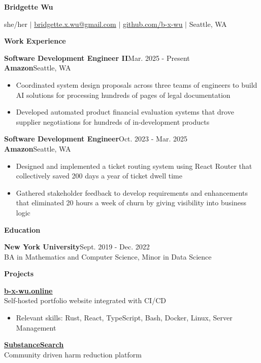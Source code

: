 \documentclass[11pt, oneside]{article}
\def\lralign #1#2{#1\hfill#2}
\def\experience #1#2#3{\vspace{6pt}\lralign{\textbf{\large#1}}{{#2}}\\#3}
\def\sectionheader #1{\vspace{15pt}\textbf{\Large #1}}
\def\link #1#2{\href{#1}{\ul{#2}}}
\begin{document}
\textbf{\LARGE Bridgette Wu}

she/her $\mid$ \link{mailto:bridgette.x.wu@gmail.com}{bridgette.x.wu@gmail.com} $\mid$ \link{https://github.com/b-x-wu}{github.com/b-x-wu} $\mid$ Seattle, WA

\sectionheader{Work Experience}

\experience{Software Development Engineer II}{Mar. 2025 - Present}{\lralign{\textbf{Amazon}}{Seattle, WA}}
\begin{itemize}
\item Coordinated system design proposals across three teams of engineers to build AI solutions for
processing hundreds of pages of legal documentation

\item Developed automated product financial evaluation systems that drove supplier negotiations for
hundreds of in-development products
\end{itemize}

\experience{Software Development Engineer}{Oct. 2023 - Mar. 2025}{\lralign{\textbf{Amazon}}{Seattle, WA}}

\begin{itemize}
\item Designed and implemented a ticket routing system using React Router that collectively saved
200 days a year of ticket dwell time

\item Gathered stakeholder feedback to develop requirements and enhancements that eliminated 20 hours a week of churn by giving visibility into business logic
\end{itemize}

\sectionheader{Education}

\experience{New York University}{Sept. 2019 - Dec. 2022}{BA in Mathematics and Computer Science, Minor in Data Science}

\sectionheader{Projects}

\experience{\link{https://b-x-wu.online/}{b-x-wu.online}}{}{Self-hosted portfolio website integrated with CI/CD}

\begin{itemize}
\item Relevant skills: Rust, React, TypeScript, Bash, Docker, Linux, Server Management
\end{itemize}

\experience{\link{https://github.com/SubstanceSearch/SubstanceSearch}{SubstanceSearch}}{}{Community driven harm reduction platform}
\end{document}
